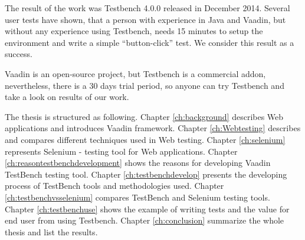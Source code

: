 	  The result of the work was Testbench 4.0.0 released in December 2014.
	  Several user tests have shown, that a person with experience in Java and
	  Vaadin, but without any experience using Testbench, needs 15 minutes to setup
	  the environment and write a simple ``button-click'' test. We consider this
	  result as a success.
	  
	  Vaadin is an open-source project, but Testbench is a commercial
	  addon, nevertheless, there is a 30 days trial period, so anyone
	  can try Testbench and take a look on results of our work.
	  
	  \iffalse
		  I will also , because Testbench is focused on testing Web
		 applications written with Vaadin. I will also describe the working flow, what
		 tools and methodologies the team used and how the final product helps
		 Vaadin developers.
	  \fi 

	  The thesis is structured as following. Chapter \ref{ch:background} describes
	  Web applications and introduces Vaadin framework. Chapter \ref{ch:Webtesting}
	  describes and compares different techniques used in Web testing. Chapter
	  \ref{ch:selenium} represents Selenium - testing tool for Web applications.
	  Chapter \ref{ch:reasontestbenchdevelopment} shows the reasons for
	  developing Vaadin TestBench testing tool. Chapter \ref{ch:testbenchdevelop} presents the developing process of TestBench tools and methodologies used.
	  Chapter \ref{ch:testbenchvsselenium} compares TestBench and Selenium testing
	  tools. Chapter \ref{ch:testbenchuse} shows the example of writing tests and
	  the value for end user from using Testbench. 
	  Chapter \ref{ch:conclusion} summarize the whole thesis and list the results.